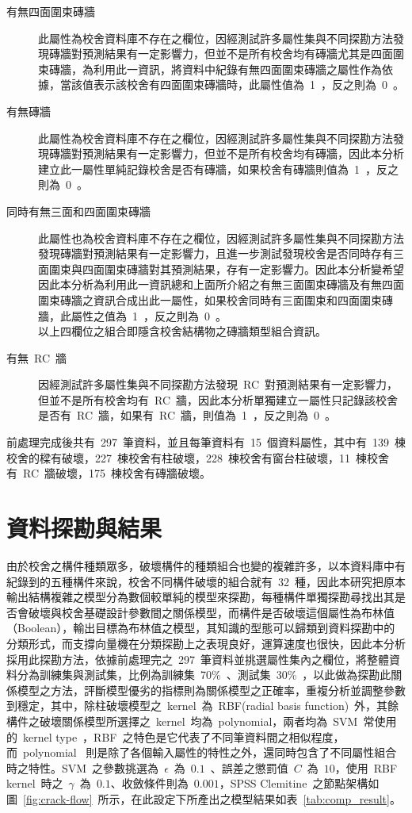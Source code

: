 \begin{description}
  \item[有無四面圍束磚牆]
  此屬性為校舍資料庫不存在之欄位，因經測試許多屬性集與不同探勘方法發現磚牆對預測結果有一定影響力，但並不是所有校舍均有磚牆尤其是四面圍束磚牆，為利用此一資訊，將資料中紀錄有無四面圍束磚牆之屬性作為依據，當該值表示該校舍有四面圍束磚牆時，此屬性值為~1~，反之則為~0~。
  \item[有無磚牆]
  此屬性為校舍資料庫不存在之欄位，因經測試許多屬性集與不同探勘方法發現磚牆對預測結果有一定影響力，但並不是所有校舍均有磚牆，因此本分析建立此一屬性單純記錄校舍是否有磚牆，如果校舍有磚牆則值為~1~，反之則為~0~。
  \item[同時有無三面和四面圍束磚牆]
  此屬性也為校舍資料庫不存在之欄位，因經測試許多屬性集與不同探勘方法發現磚牆對預測結果有一定影響力，且進一步測試發現校舍是否同時存有三面圍束與四面圍束磚牆對其預測結果，存有一定影響力。因此本分析變希望因此本分析為利用此一資訊總和上面所介紹之有無三面圍束磚牆及有無四面圍束磚牆之資訊合成出此一屬性，如果校舍同時有三面圍束和四面圍束磚牆，此屬性之值為~1~，反之則為~0~。\\
  以上四欄位之組合即隱含校舍結構物之磚牆類型組合資訊。
  \item[有無~RC~牆]
  因經測試許多屬性集與不同探勘方法發現~RC~對預測結果有一定影響力，但並不是所有校舍均有~RC~牆，因此本分析單獨建立一屬性只記錄該校舍是否有~RC~牆，如果有~RC~牆，則值為~1~，反之則為~0~。
\end{description}

前處理完成後共有~297~筆資料，並且每筆資料有~15~個資料屬性，其中有~139~棟校舍的樑有破壞，227~棟校舍有柱破壞，228~棟校舍有窗台柱破壞，11~棟校舍有~RC~牆破壞，175~棟校舍有磚牆破壞。

\section{資料探勘與結果}

由於校舍之構件種類眾多，破壞構件的種類組合也變的複雜許多，以本資料庫中有紀錄到的五種構件來說，校舍不同構件破壞的組合就有~32~種，因此本研究把原本輸出結構複雜之模型分為數個較單純的模型來探勘，每種構件單獨探勘尋找出其是否會破壞與校舍基礎設計參數間之關係模型，而構件是否破壞這個屬性為布林值（Boolean），輸出目標為布林值之模型，其知識的型態可以歸類到資料探勘中的分類形式，而支撐向量機在分類探勘上之表現良好，運算速度也很快，因此本分析採用此探勘方法，依據前處理完之~297~筆資料並挑選屬性集內之欄位，將整體資料分為訓練集與測試集，比例為訓練集~70\%~、測試集~30\%~，以此做為探勘此關係模型之方法，評斷模型優劣的指標則為關係模型之正確率，重複分析並調整參數到穩定，其中，除柱破壞模型之~kernel~為~RBF(radial basis function)~外，其餘構件之破壞關係模型所選擇之~kernel~均為~polynomial，兩者均為~SVM~常使用的~kernel type~，RBF~之特色是它代表了不同筆資料間之相似程度，而~polynomial
~則是除了各個輸入屬性的特性之外，還同時包含了不同屬性組合時之特性。SVM~之參數挑選為~$\epsilon$~為~$0.1$~、誤差之懲罰值~$C$~為~$10$，使用~RBF kernel~時之~$\gamma$~為~$0.1$、收斂條件則為~$0.001$，SPSS Clemitine~之節點架構如圖~\ref{fig:crack-flow}~所示，在此設定下所產出之模型結果如表~\ref{tab:comp_result}。

